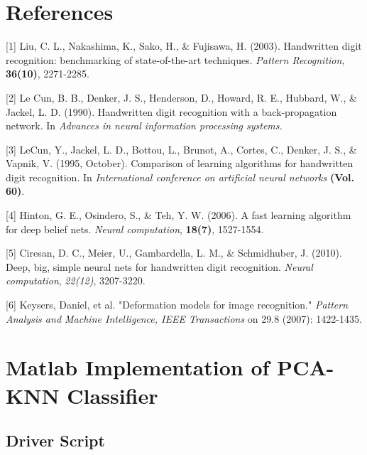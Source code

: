 \documentclass{article} %
\begin{document}
\section{References}


\small{
[1] Liu, C. L., Nakashima, K., Sako, H., \& Fujisawa, H. (2003). Handwritten
digit recognition: benchmarking of state-of-the-art techniques. {\it Pattern
    Recognition}, {\bf 36(10)}, 2271-2285.

[2] Le Cun, B. B., Denker, J. S., Henderson, D., Howard, R. E., Hubbard, W., \&
Jackel, L. D. (1990). Handwritten digit recognition with a back-propagation
network. In {\it Advances in neural information processing systems.}

[3] LeCun, Y., Jackel, L. D., Bottou, L., Brunot, A., Cortes, C., Denker, J.
S., \& Vapnik, V. (1995, October). Comparison of learning algorithms for
handwritten digit recognition. In {\it International conference on artificial
    neural networks} {\bf (Vol. 60)}.

[4] Hinton, G. E., Osindero, S., \& Teh, Y. W. (2006). A fast learning
algorithm for deep belief nets. {\it Neural computation}, {\bf 18(7)}, 1527-1554.

[5] Ciresan, D. C., Meier, U., Gambardella, L. M., \& Schmidhuber, J. (2010).
Deep, big, simple neural nets for handwritten digit recognition. {\it Neural
    computation}, {\it 22(12)}, 3207-3220.

[6] Keysers, Daniel, et al. "Deformation models for image recognition."
{\it Pattern Analysis and Machine Intelligence, IEEE Transactions} on 29.8 (2007):
1422-1435.
}

\newpage
\appendix

\section{Matlab Implementation of PCA-KNN Classifier}
\subsection{Driver Script}

\end{document}
